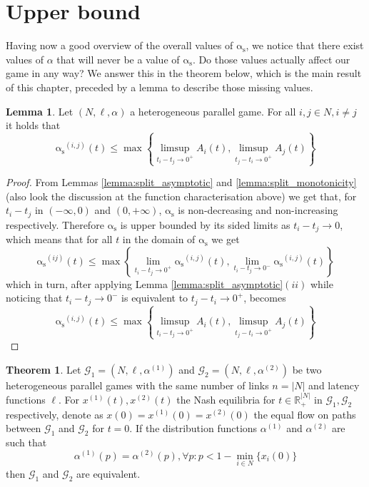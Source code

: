 \documentclass[10pt,a4paper]{book}
\newcommand{\as}{\mathrm{\alpha_s}}
\newcommand{\R}{\mathbb{R}}
\newcommand{\Gm}{\mathcal{G}}
\theoremstyle{definition}
\newtheorem{theorem}[definition]{Theorem}
\newtheorem{lemma}[definition]{Lemma}
\theoremstyle{comment}
\begin{document}
\section{Upper bound}

Having now a good overview of the overall values of $\as$, we notice that there exist values of $\alpha$ that will never be a value of $\as$.
Do those values actually affect our game in any way?
We answer this in the theorem below, which is the main result of this chapter, preceded by a lemma to describe those missing values.

\begin{lemma}
	\label{lemma:split_upper_bound}
	Let $(N, \ell, \alpha)$ a heterogeneous parallel game.
	For all $i, j \in N, i \ne j$ it holds that
	\[\as^{(i, j)}(t) \le \max\left\{\limsup_{t_i - t_j \rightarrow 0^+} A_i(t), \limsup_{t_j - t_i \rightarrow 0^+} A_j(t)\right\}\]
\end{lemma}

\begin{proof}
	 From Lemmas \ref{lemma:split_asymptotic} and \ref{lemma:split_monotonicity} (also look the discussion at the function characterisation above) we get that, for $t_i - t_j$ in $(-\infty, 0)$ and $(0, +\infty)$, $\as$ is non-decreasing and non-increasing respectively.
	 Therefore $\as$ is upper bounded by its sided limits as $t_i - t_j \rightarrow 0$, which means that for all $t$ in the domain of $\as$ we get
	 \[\as^{(i j)}(t) \le \max\left\{\lim_{t_i - t_j \rightarrow 0^+} \as^{(i, j)}(t), \lim_{t_i - t_j \rightarrow 0^-} \as^{(i, j)}(t)\right\}\]
	 which in turn, after applying Lemma \ref{lemma:split_asymptotic}$(ii)$ while noticing that $t_i - t_j \rightarrow 0^-$ is equivalent to $t_j - t_i \rightarrow 0^+$, becomes
	 \[\as^{(i, j)}(t) \le \max\left\{\limsup_{t_i - t_j \rightarrow 0^+} A_i(t), \limsup_{t_j - t_i \rightarrow 0^+} A_j(t)\right\}\]
\end{proof}

\begin{theorem}
	\label{theorem:alpha_upper_irrelevant}
	Let $\Gm_1 = (N, \ell, \alpha^{(1)})$ and $\Gm_2 = (N, \ell, \alpha^{(2)})$ be two heterogeneous parallel games with the same number of links $n = |N|$  and latency functions $\ell$.
	For $x^{(1)}(t), x^{(2)}(t)$ the Nash equilibria for $t \in \R_+^{|N|}$ in $\Gm_1, \Gm_2$ respectively, denote as $x(0) = x^{(1)}(0) = x^{(2)}(0)$ the equal flow on paths between $\Gm_1$ and $\Gm_2$ for $t = 0$.
	If the distribution functions $\alpha^{(1)}$ and $\alpha^{(2)}$ are such that
	\[\alpha^{(1)}(p) = \alpha^{(2)}(p), \forall p: p < 1 - \min_{i \in N}\{x_i(0)\}\]
	then $\Gm_1$ and $\Gm_2$ are equivalent.
\end{theorem}
\end{document}
